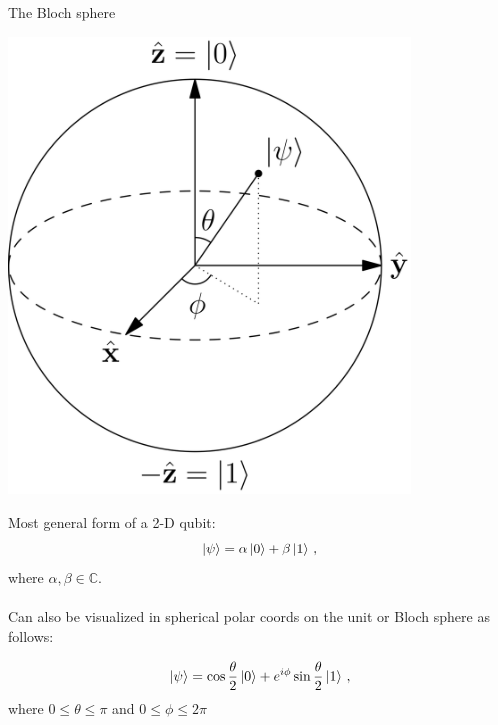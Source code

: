 \documentclass[10pt]{beamer}
\begin{document}
{
\begin{frame}[fragile]{The Bloch sphere}

\begin{minipage}[c]{.5\textwidth}
		\hspace{2mm}
       \includegraphics[width=0.8\textwidth]{blochsphere.png}
       \captionsetup{justification=raggedright, singlelinecheck=false}
\end{minipage}%
\begin{minipage}[c][][b]{.5\textwidth}
Most general form of a 2-D qubit:
\begin{equation}
\label{equ: blochqubit}
\ket{\psi} = \alpha \ket{0} + \beta \ket{1}\, ,
\end{equation}
where $\alpha,\beta \in \mathbb{C}$.\\
\\
Can also be visualized in spherical polar coords on the unit or Bloch sphere as follows: 

\begin{equation}
\label{equ: blochqubit}
\ket{\psi} = \cos\frac{\theta}{2} \ket{0} + e^{i \phi} \sin\frac{\theta}{2} \ket{1}\, ,
\end{equation}
where $0 \leq \theta \leq \pi$ and $0 \leq \phi \leq 2\pi$
\null
\par\xdef\tpd{\the\prevdepth}
\end{minipage}

\end{frame}
}
\end{document}
